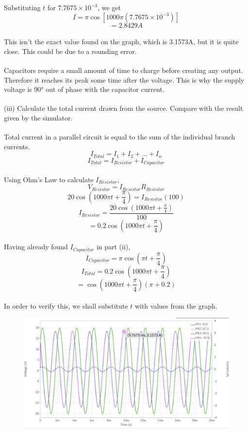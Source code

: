 \documentclass[12pt]{article}
\begin{document}
\noindent Substituting \(t\) for \(7.7675 \times 10^{-3}\), we get\\
\[I = \pi \cos [1000 \pi (7.7675 \times 10^{-3})]\]
\[= 2.8429 A\]\\
This isn't the exact value found on the graph, which is 3.1573A, but it is quite close. This could be due to a rounding error.\\
\\
Capacitors require a small amount of time to charge before creating any output. Therefore it reaches its peak some time after the voltage. This is why the supply voltage is 90° out of phase with the capacitor current.\\
\\
(iii) Calculate the total current drawn from the source. Compare with the result given by the simulator.\\
\\
Total current in a parallel circuit is equal to the sum of the individual branch currents.\\
\[I_{Total}  = I_1 + I_2 + ... + I_n\]
\[I_{Total} = I_{Resistor} + I_{Capacitor}\]\\
Using Ohm's Law to calculate \(I_{Resistor}\),\\
\[V_{Resistor} = I_{Resistor} R_{Resistor}\]
\[20\cos (1000\pi t + \frac{\pi}{4}) = I_{Resistor}(100)\]
\[I_{Resistor} = \frac{20\cos (1000\pi t + \frac{\pi}{4})}{100}\]
\[= 0.2\cos (1000\pi t + \frac{\pi}{4})\]\\
Having already found \(I_{Capacitor}\) in part (ii),\\
\[I_{Capacitor} = \pi \cos (\pi t + \frac{\pi}{4})\]
\[I_{Total} = 0.2\cos (1000\pi t + \frac{\pi}{4})\]
\[= \cos (1000\pi t + \frac{\pi}{4})(\pi + 0.2)\]\\
In order to verify this, we shall substitute \(t\) with values from the graph.\\
\begin{figure}[!h] 
	\begin{centering}
		\includegraphics[keepaspectratio = true, width = 6in]{q1(iii).png}
	\end{centering}
\end{figure}\\
\end{document}
